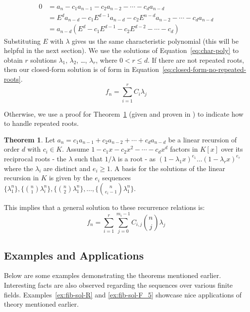 \documentclass[a4paper]{article}
\theoremstyle{definition}
\newtheorem{theorem}{Theorem}[section]
\begin{document}
\begin{align*}
0
&= a_n-c_1a_{n-1}-c_2a_{n-2}-\cdots-c_{d}a_{n-d} \\
&= E^{d}a_{n-d}-c_1E^{d-1}a_{n-d}-c_2E^{n-d}a_{n-2}-\cdots-c_{d}a_{n-d} \\
&= a_{n-d}(E^d-c_1E^{d-1}-c_2E^{d-2}-\cdots-c_d)
\end{align*}
Substituting $E$ with $\lambda$ gives us the same characteristic polynomial (this will be helpful in the next
section). We use the solutions of Equation~\ref{eq:char-poly} to obtain $r$ solutions $\lambda_1$,
$\lambda_2$, \ldots, $\lambda_r$, where $0<r\le d$. If there are not repeated roots, then our closed-form
solution is of form in Equation~\ref{eq:closed-form-no-repeated-roots}.
\begin{equation}
f_n=\sum_{i=1}^r C_{i}\lambda_j
\label{eq:closed-form-no-repeated-roots}
\end{equation}

Otherwise, we use a proof for Theorem~\ref{thm:repeated-roots} (given and proven in
\cite{bib:solve-lin-rec-field}) to indicate how to handle repeated roots. 

\begin{theorem}
Let $a_n = c_1a_{n-1} + c_2a_{n-2} + \cdots + c_{d}a_{n-d}$ be a linear recursion of order $d$ with
$c_i \in K$. Assume $1 - c_1x - c_2x^2 - \cdots - c_{d}x^d$ factors in $K[x]$ over its reciprocal roots - the
$\lambda$ such that $1/\lambda$ is a root - as $(1-\lambda_{1}x)^{e_1} \ldots (1-\lambda_{r}x)^{e_r}$ where
the $\lambda_i$ are distinct and $e_i \ge 1$. A basis for the solutions of the linear recursion in $K$ is
given by the $e_i$ sequences
$\{\lambda_1^n\}, \{\binom{n}{1}\lambda_i^n\}, \{\binom{n}{2}\lambda_1^n\}, \ldots, \{\binom{n}{e_i-1}\lambda_1^n\}$.
\label{thm:repeated-roots}
\end{theorem}
This implies that a general solution to these recurrence relations is:
\begin{equation}
f_n=\sum_{i=1}^r\sum_{j=0}^{m_i-1} C_{i,j}\binom{n}{j}\lambda_j
\label{eq:closed-form-repeated-roots}
\end{equation}

\subsection{Examples and Applications}

Below are some examples demonstrating the theorems mentioned earlier. Interesting facts are also
observed regarding the sequences over various finite fields. Examples~\ref{ex:fib-sol-R} and
\ref{ex:fib-sol-F_5} showcase nice applications of theory mentioned earlier.
\end{document}
